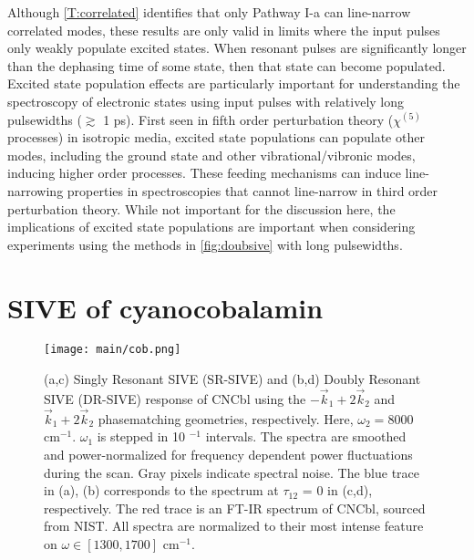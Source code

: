 \documentclass[aip, jcp, reprint, twocolumn]{revtex4-2}
\begin{document}
Although \autoref{T:correlated} identifies that only Pathway I-a can line-narrow correlated modes, these results are only valid in limits where the input pulses only weakly populate excited states.
When resonant pulses are significantly longer than the dephasing time of some state, then that state can become populated.
Excited state population effects are particularly important for understanding the spectroscopy of electronic states using input pulses with relatively long pulsewidths ($\gtrsim$ 1 ps). \cite{RN319}
First seen in fifth order perturbation theory ($\chi^{(5)}$ processes) in isotropic media, excited state populations can populate other modes, including the ground state and other vibrational/vibronic modes, inducing higher order processes.\cite{Carlson87, RN471}
These feeding mechanisms can induce line-narrowing properties in spectroscopies that cannot line-narrow in third order perturbation theory.\cite{RN319, Carlson87, RN471, RN410}
While not important for the discussion here, the implications of excited state populations are important when considering experiments using the methods in \autoref{fig:doubsive} with long pulsewidths. 

\section{SIVE of cyanocobalamin}

\begin{figure*}[!htbp]
	\centering
	\texttt{[image: main/cob.png]}
	\caption{
		(a,c) Singly Resonant SIVE (SR-SIVE) and (b,d) Doubly Resonant SIVE (DR-SIVE) response of CNCbl using the $-\vec{k}_1 + 2\vec{k}_2$ and $\vec{k}_1 + 2\vec{k}_2$ phasematching geometries, respectively.
		Here, $\omega_2 = 8000$ cm$^{-1}$.
		$\omega_1$ is stepped in 10 $^{-1}$ intervals.
		The spectra are smoothed and power-normalized for frequency dependent power fluctuations during the scan.
		Gray pixels indicate spectral noise.
		The blue trace in (a), (b) corresponds to the spectrum at $\tau_{12}$ = 0 in (c,d), respectively.
		The red trace is an FT-IR spectrum of CNCbl, sourced from NIST. 
		All spectra are normalized to their most intense feature on $\omega \in [1300, 1700]$ cm$^{-1}$.}
	\label{fig:cobsive}
\end{figure*}
\end{document}
